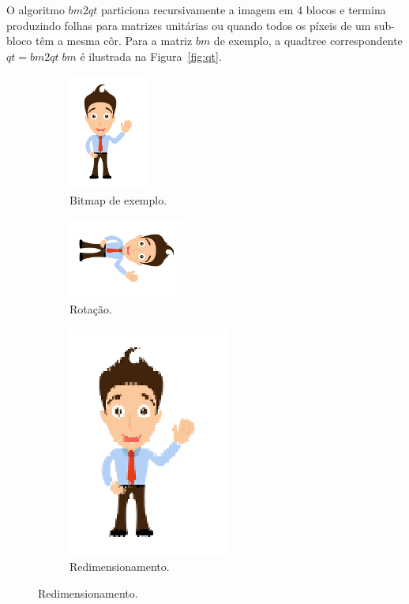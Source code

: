 \documentclass[a4paper]{article}
\newcommand{\Varid}[1]{\mathit{#1}}
\begin{document}
O algoritmo \ensuremath{\Varid{bm2qt}} particiona recursivamente a imagem em $4$ blocos e termina produzindo folhas para matrizes unitárias ou quando todos os píxeis de um sub-bloco têm a mesma côr.
Para a matriz \ensuremath{\Varid{bm}} de exemplo, a quadtree correspondente \ensuremath{\Varid{qt}\mathrel{=}\Varid{bm2qt}\;\Varid{bm}} é ilustrada na Figura~\ref{fig:qt}.

\begin{figure}
%
\begin{subfigure}{0.5\textwidth}
\centering
\includegraphics[width=0.2\linewidth]{cp1718t_media/person.png}
\caption{Bitmap de exemplo.}
\label{fig:person}
\end{subfigure}
%
\begin{subfigure}{0.5\textwidth}
\centering
\includegraphics[height=0.2\linewidth]{cp1718t_media/person90.png}
\caption{Rotação.}
\label{fig:person90}
\end{subfigure}
%
\begin{subfigure}{0.5\textwidth}
\centering
\includegraphics[width=0.4\linewidth]{cp1718t_media/personx2.png}
\caption{Redimensionamento.}

\end{subfigure}
\end{figure}
\end{document}
